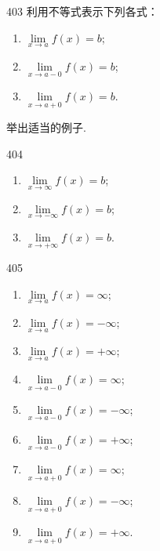 \begin{prob}[L]{403}
利用不等式表示下列各式：
\begin{enumerate}[label=(\alph*), itemsep=2pt, topsep=3pt]
  \item $\lim\limits_{x \to a} f(x) = b$;
  \item $\lim\limits_{x \to a-0} f(x) = b$;
  \item $\lim\limits_{x \to a+0} f(x) = b$.
\end{enumerate}
举出适当的例子.
\end{prob}


\begin{prob}[L]{404}
\begin{enumerate}[label=(\alph*), itemsep=2pt, topsep=3pt]
  \item $\lim\limits_{x \to \infty} f(x) = b$;
  \item $\lim\limits_{x \to -\infty} f(x) = b$;
  \item $\lim\limits_{x \to +\infty} f(x) = b$.
\end{enumerate}
\end{prob}

\begin{prob}[L]{405}
\begin{enumerate}[label=(\alph*), itemsep=2pt, topsep=3pt]
  \item $\lim\limits_{x \to a} f(x) = \infty$;
  \item $\lim\limits_{x \to a} f(x) = -\infty$;
  \item $\lim\limits_{x \to a} f(x) = +\infty$;
  \item $\lim\limits_{x \to a-0} f(x) = \infty$;
  \item $\lim\limits_{x \to a-0} f(x) = -\infty$;
  \item $\lim\limits_{x \to a-0} f(x) = +\infty$;
  \item $\lim\limits_{x \to a+0} f(x) = \infty$;
  \item $\lim\limits_{x \to a+0} f(x) = -\infty$;
  \item $\lim\limits_{x \to a+0} f(x) = +\infty$.
\end{enumerate}
\end{prob}

